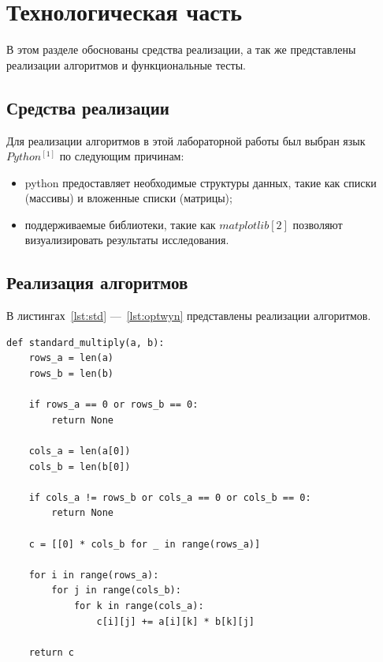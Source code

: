 \clearpage


\chapter{Технологическая часть}\label{ch:-2}

В этом разделе обоснованы средства реализации, а так же представлены реализации алгоритмов и функциональные тесты.


\section{Средства реализации}\label{sec:-2}

Для реализации алгоритмов в этой лабораторной работы был выбран язык $Python^{[1]}$ по следующим причинам:
\begin{itemize}
    \item python предоставляет необходимые структуры данных, такие как списки (массивы) и вложенные списки (матрицы);
    \item поддерживаемые библиотеки, такие как $matplotlib{[2]}$ позволяют визуализировать результаты исследования.
\end{itemize}

\clearpage


\section{Реализация алгоритмов}

В листингах~\ref{lst:std} ---~\ref{lst:optwyn} представлены реализации алгоритмов.

\begin{lstlisting}[style=python, label=lst:std,caption=Стандартный алгоритм умножения матриц]
def standard_multiply(a, b):
    rows_a = len(a)
    rows_b = len(b)

    if rows_a == 0 or rows_b == 0:
        return None

    cols_a = len(a[0])
    cols_b = len(b[0])

    if cols_a != rows_b or cols_a == 0 or cols_b == 0:
        return None

    c = [[0] * cols_b for _ in range(rows_a)]

    for i in range(rows_a):
        for j in range(cols_b):
            for k in range(cols_a):
                c[i][j] += a[i][k] * b[k][j]

    return c
\end{lstlisting}
\clearpage


